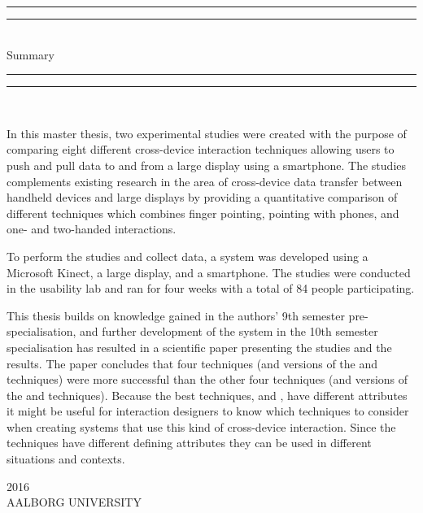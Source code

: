 \begin{dummy}

	\textheight
	\centering
	\vspace*{\baselineskip}
	\rule{\textwidth}{2pt}\vspace*{-\baselineskip}\vspace*{2pt}
	\rule{\textwidth}{0.4pt}\\[\baselineskip]
	{\LARGE Summary}\\[0.2\baselineskip]
	\rule{\textwidth}{0.4pt}\vspace*{-\baselineskip}\vspace{3.2pt}
	\rule{\textwidth}{2pt}\\[\baselineskip]
	\scshape
	{} \par

\begin{summary}
In this master thesis, two experimental studies were created with the purpose of comparing eight different cross-device interaction techniques allowing users to push and pull data to and from a large display using a smartphone.
The studies complements existing research in the area of cross-device data transfer between handheld devices and large displays by providing a quantitative comparison of different techniques which combines finger pointing, pointing with phones, and one- and two-handed interactions.

To perform the studies and collect data, a system was developed using a Microsoft Kinect, a large display, and a smartphone.
The studies were conducted in the usability lab and ran for four weeks with a total of 84 people participating. 

This thesis builds on knowledge gained in the authors' 9th semester pre-specialisation, and further development of the system in the 10th semester specialisation has resulted in a scientific paper presenting the studies and the results.
The paper concludes that four techniques (\pull and \push versions of the \swipe and \throw techniques) were more successful than the other four techniques (\pull and \push versions of the \grab and \tilt techniques).
Because the best techniques, \swipe and \throw, have different attributes it might be useful for interaction designers to know which techniques to consider when creating systems that use this kind of cross-device interaction. 
Since the techniques have different defining attributes they can be used in different situations and contexts.
\end{summary}
	\vspace*{2\baselineskip}
		{\scshape 2016} \\
		{\large AALBORG UNIVERSITY}\par
	
\end{dummy}